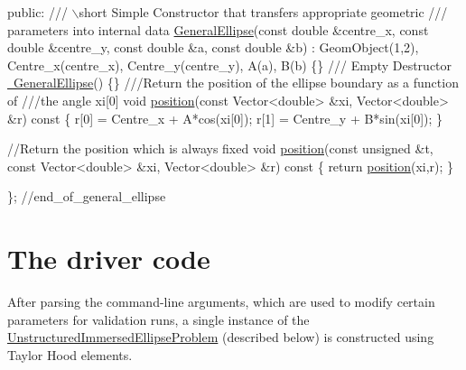 \begin{DoxyCodeInclude}
\textcolor{keyword}{public}:
 \textcolor{comment}{}
\textcolor{comment}{ /// \(\backslash\)short Simple Constructor that transfers appropriate geometric }
\textcolor{comment}{ /// parameters into internal data}
\textcolor{comment}{} \hyperlink{classGeneralEllipse_a50dc036d709bcd1d53eafb62b5548f67}{GeneralEllipse}(\textcolor{keyword}{const} \textcolor{keywordtype}{double} &centre\_x, \textcolor{keyword}{const} \textcolor{keywordtype}{double} &centre\_y,
                \textcolor{keyword}{const} \textcolor{keywordtype}{double} &a, \textcolor{keyword}{const} \textcolor{keywordtype}{double} &b)
  : GeomObject(1,2), Centre\_x(centre\_x), Centre\_y(centre\_y), A(a), B(b)
  \{\}
\textcolor{comment}{}
\textcolor{comment}{ /// Empty Destructor}
\textcolor{comment}{} \hyperlink{classGeneralEllipse_a3ac5c17cf8c4998f1b74913860cb3bb9}{~GeneralEllipse}() \{\}
\textcolor{comment}{}
\textcolor{comment}{ ///Return the position of the ellipse boundary as a function of }
\textcolor{comment}{ ///the angle xi[0]}
\textcolor{comment}{} \textcolor{keywordtype}{void} \hyperlink{classGeneralEllipse_a85e975c70441a9c9c711b5e27d124bff}{position}(\textcolor{keyword}{const} Vector<double> &xi, Vector<double> &r)\textcolor{keyword}{ const}
\textcolor{keyword}{  }\{
   r[0] = Centre\_x + A*cos(xi[0]);
   r[1] = Centre\_y + B*sin(xi[0]);
  \}

 \textcolor{comment}{//Return the position which is always fixed}
 \textcolor{keywordtype}{void} \hyperlink{classGeneralEllipse_a85e975c70441a9c9c711b5e27d124bff}{position}(\textcolor{keyword}{const} \textcolor{keywordtype}{unsigned} &t,
               \textcolor{keyword}{const} Vector<double> &xi, Vector<double> &r)\textcolor{keyword}{ const}
\textcolor{keyword}{  }\{
   \textcolor{keywordflow}{return} \hyperlink{classGeneralEllipse_a85e975c70441a9c9c711b5e27d124bff}{position}(xi,r);
  \}

\};
\textcolor{comment}{//end\_of\_general\_ellipse}

\end{DoxyCodeInclude}




 

\hypertarget{index_driver}{}\section{The driver code}\label{index_driver}
After parsing the command-\/line arguments, which are used to modify certain parameters for validation runs, a single instance of the {\ttfamily \hyperlink{classUnstructuredImmersedEllipseProblem}{Unstructured\+Immersed\+Ellipse\+Problem}} (described below) is constructed using Taylor Hood elements.


